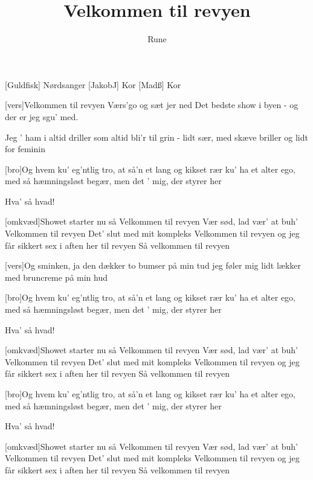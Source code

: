\documentclass[a4paper,11pt]{article}
\title{Velkommen til revyen}
\author{Rune}
\begin{document}
\maketitle

\begin{roles}
[Guldfisk] Nørdsanger
[JakobJ] Kor
[Madß] Kor
\end{roles}

\begin{props}
\end{props}

  
\begin{song}

[vers]Velkommen til revyen
Værs'go og sæt jer ned
Det bedste show i byen
- og der er jeg sgu' med.

Jeg ' ham i altid driller
som altid bli'r til grin
- lidt sær, med skæve briller
og lidt for feminin

[bro]Og hvem ku' eg'ntlig tro,
at så'n et lang og kikset rær
ku' ha et alter ego,
med så hæmningsløst begær,
men det ' mig, der styrer her

Hva' så hvad!

[omkvæd]Showet starter nu
så Velkommen til revyen
Vær sød, lad vær' at buh'
Velkommen til revyen
Det' slut med mit kompleks
Velkommen til revyen
og jeg får sikkert sex
i aften her til revyen
Så velkommen til revyen

[vers]Og sminken, ja den dækker
to bumser på min tud
jeg føler mig lidt lækker
med bruncreme på min hud

[bro]Og hvem ku' eg'ntlig tro,
at så'n et lang og kikset rær
ku' ha et alter ego,
med så hæmningsløst begær,
men det ' mig, der styrer her

Hva' så hvad!

[omkvæd]Showet starter nu
så Velkommen til revyen
Vær sød, lad vær' at buh'
Velkommen til revyen
Det' slut med mit kompleks
Velkommen til revyen
og jeg får sikkert sex
i aften her til revyen
Så velkommen til revyen


[bro]Og hvem ku' eg'ntlig tro,
at så'n et lang og kikset rær
ku' ha et alter ego,
med så hæmningsløst begær,
men det ' mig, der styrer her

Hva' så hvad!

[omkvæd]Showet starter nu
så Velkommen til revyen
Vær sød, lad vær' at buh'
Velkommen til revyen
Det' slut med mit kompleks
Velkommen til revyen
og jeg får sikkert sex
i aften her til revyen
Så velkommen til revyen


\end{song}
\end{document}
